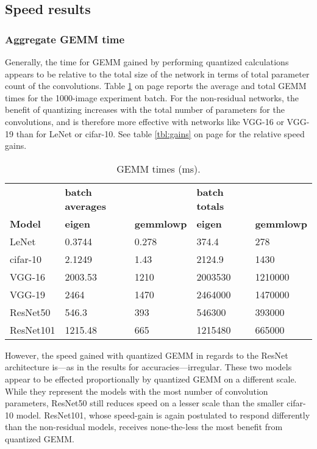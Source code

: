 \subsection{Speed results}
\subsubsection{Aggregate GEMM time}
Generally, the time for GEMM gained by performing quantized calculations appears to be relative to the total size of the network in terms of total parameter count of the convolutions. Table \ref{tbl:gemmtime} on page \pageref{tbl:gemmtime} reports the average and total GEMM times for the 1000-image experiment batch. For the non-residual networks, the benefit of quantizing increases with the total number of parameters for the convolutions, and is therefore more effective with networks like VGG-16 or VGG-19 than for LeNet or cifar-10. See table \ref{tbl:gains} on page \pageref{tbl:gains} for the relative speed gains.

\begin{table}[]
\centering
\caption[GEMM timings]{GEMM times (ms).}
\label{tbl:gemmtime}
\begin{tabular}{lllll}
& \textbf{batch averages}   &                              & \textbf{batch totals}     &     \\
\textbf{Model}     & \textbf{eigen} & \textbf{gemmlowp} & \textbf{eigen} & \textbf{gemmlowp} \\
LeNet     & 0.3744         & 0.278             & 374.4          & 278               \\
cifar-10  & 2.1249         & 1.43              & 2124.9         & 1430              \\
VGG-16    & 2003.53        & 1210              & 2003530        & 1210000           \\
VGG-19    & 2464           & 1470              & 2464000        & 1470000           \\
ResNet50  & 546.3          & 393               & 546300         & 393000            \\
ResNet101 & 1215.48        & 665               & 1215480        & 665000           
\end{tabular}
\end{table}

However, the speed gained with quantized GEMM in regards to the ResNet architecture is---as in the results for accuracies---irregular. These two models appear to be effected proportionally by quantized GEMM on a different scale. While they represent the models with the most number of convolution parameters, ResNet50 still reduces speed on a lesser scale than the smaller cifar-10 model. ResNet101, whose speed-gain is again postulated to respond differently than the non-residual models, receives none-the-less the most benefit from quantized GEMM.

